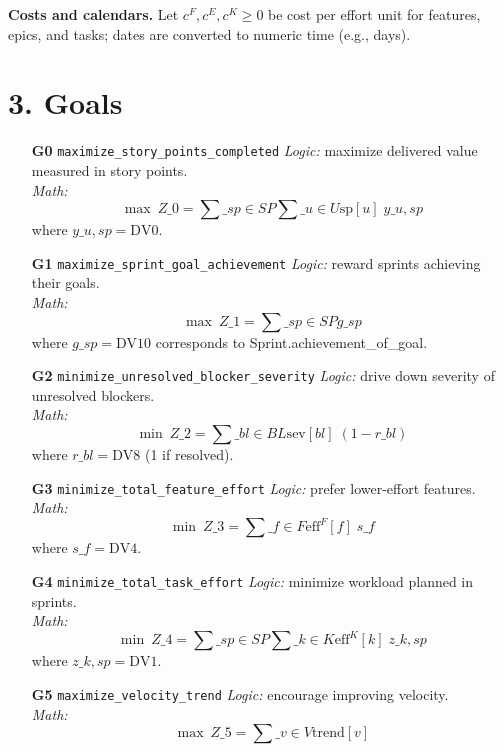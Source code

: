 \documentclass[11pt]{article}
\begin{document}
\noindent \textbf{Costs and calendars.} Let $c^{F},c^{E},c^{K}\ge 0$ be cost per effort unit for features, epics, and tasks; dates are converted to numeric time (e.g., days).

\section{3. Goals}
\begin{itemize}[leftmargin=2em]
  \item[\textbf{G0} \texttt{maximize\_story\_points\_completed}] \emph{Logic:} maximize delivered value measured in story points. \\
  \emph{Math:} 
  \[
  \max~ Z\_0=\sum\_{sp\in SP}\sum\_{u\in U} \mathrm{sp}[u]\; y\_{u,sp}
  \]
  where $y\_{u,sp}=\text{DV0}$.

  \item[\textbf{G1} \texttt{maximize\_sprint\_goal\_achievement}] \emph{Logic:} reward sprints achieving their goals. \\
  \emph{Math:}
  \[
  \max~ Z\_1=\sum\_{sp\in SP} g\_{sp}
  \]
  where $g\_{sp}=\text{DV10}$ corresponds to Sprint.achievement\_of\_goal.

  \item[\textbf{G2} \texttt{minimize\_unresolved\_blocker\_severity}] \emph{Logic:} drive down severity of unresolved blockers. \\
  \emph{Math:}
  \[
  \min~ Z\_2=\sum\_{bl\in BL} \mathrm{sev}[bl]\;(1-r\_{bl})
  \]
  where $r\_{bl}=\text{DV8}$ (1 if resolved).

  \item[\textbf{G3} \texttt{minimize\_total\_feature\_effort}] \emph{Logic:} prefer lower-effort features. \\
  \emph{Math:}
  \[
  \min~ Z\_3=\sum\_{f\in F} \mathrm{eff}^{F}[f]\; s\_f
  \]
  where $s\_f=\text{DV4}$.

  \item[\textbf{G4} \texttt{minimize\_total\_task\_effort}] \emph{Logic:} minimize workload planned in sprints. \\
  \emph{Math:}
  \[
  \min~ Z\_4=\sum\_{sp\in SP}\sum\_{k\in K} \mathrm{eff}^{K}[k]\; z\_{k,sp}
  \]
  where $z\_{k,sp}=\text{DV1}$.

  \item[\textbf{G5} \texttt{maximize\_velocity\_trend}] \emph{Logic:} encourage improving velocity. \\
  \emph{Math:}
  \[
  \max~ Z\_5=\sum\_{v\in V}\mathrm{trend}[v]
  \]


\end{itemize}
\end{document}
